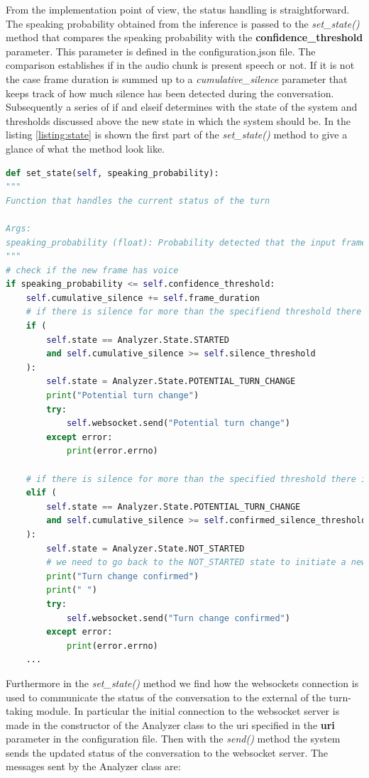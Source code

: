 \documentclass[../main.tex]{subfiles}
\begin{document}
From the implementation point of view, the status handling is straightforward. The speaking probability obtained from the inference is passed to the \textit{set\_state()} method that compares the speaking probability with the \textbf{confidence\_threshold} parameter. This parameter is defined in the configuration.json file. The comparison establishes if in the audio chunk is present speech or not. If it is not the case frame duration is summed up to a \textit{cumulative\_silence} parameter that keeps track of how much silence has been detected during the conversation. Subsequently a series of if and elseif determines with the state of the system and thresholds discussed above the new state in which the system should be. In the listing \ref{listing:state} is shown the first part of the \textit{set\_state()} method to give a glance of what the method look like.

\begin{lstlisting}[language=Python, caption={set\_state() method}]
def set_state(self, speaking_probability):
"""
Function that handles the current status of the turn

Args:
speaking_probability (float): Probability detected that the input frame contains voice
"""
# check if the new frame has voice
if speaking_probability <= self.confidence_threshold:
    self.cumulative_silence += self.frame_duration
    # if there is silence for more than the specifiend threshold there could be a turn change
    if (
        self.state == Analyzer.State.STARTED
        and self.cumulative_silence >= self.silence_threshold
    ):
        self.state = Analyzer.State.POTENTIAL_TURN_CHANGE
        print("Potential turn change")
        try:
            self.websocket.send("Potential turn change")
        except error:
            print(error.errno)

    # if there is silence for more than the specified threshold there is an actual turn change
    elif (
        self.state == Analyzer.State.POTENTIAL_TURN_CHANGE
        and self.cumulative_silence >= self.confirmed_silence_threshold
    ):
        self.state = Analyzer.State.NOT_STARTED
        # we need to go back to the NOT_STARTED state to initiate a new turn
        print("Turn change confirmed")
        print(" ")
        try:
            self.websocket.send("Turn change confirmed")
        except error:
            print(error.errno)
    ...   
\end{lstlisting}
\label{listing:state}

Furthermore in the \textit{set\_state()} method we find how the websockets connection is used to communicate the status of the conversation to the external of the turn-taking module. In particular the initial connection to the websocket server is made in the constructor of the Analyzer class to the uri specified in the \textbf{uri} parameter in the configuration file. Then with the \textit{send()} method the system sends the updated status of the conversation to the websocket server. The messages sent by the Analyzer class are:
\end{document}
